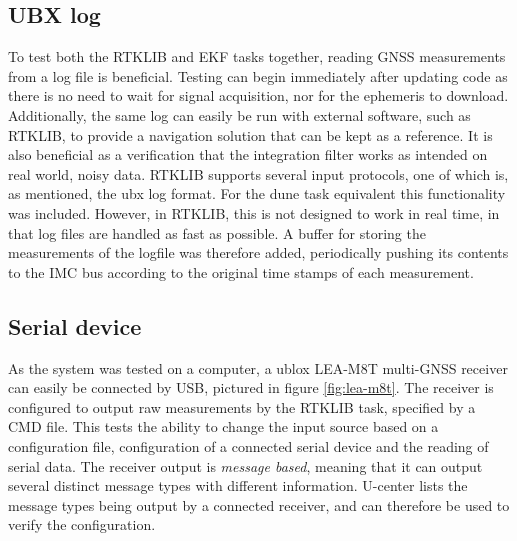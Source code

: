     \subsection{UBX log}
        \label{sec:rtklib-ubx-log}
        To test both the RTKLIB and EKF tasks together, reading GNSS measurements from a log file is beneficial. Testing can begin immediately after updating code as there is no need to wait for signal acquisition, nor for the ephemeris to download. Additionally, the same log can easily be run with external software, such as RTKLIB, to provide a navigation solution that can be kept as a reference. It is also beneficial as a verification that the integration filter works as intended on real world, noisy data. RTKLIB supports several input protocols, one of which is, as mentioned, the ubx log format. For the dune task equivalent this functionality was included. However, in RTKLIB, this is not designed to work in real time, in that log files are handled as fast as possible. A buffer for storing the measurements of the logfile was therefore added, periodically pushing its contents to the IMC bus according to the original time stamps of each measurement.
    
    \subsection{Serial device}
        As the system was tested on a computer, a ublox LEA-M8T multi-GNSS receiver can easily be connected by USB, pictured in figure \ref{fig:lea-m8t}. The receiver is configured to output raw measurements by the RTKLIB task, specified by a CMD file. This tests the ability to change the input source based on a configuration file, configuration of a connected serial device and the reading of serial data. The receiver output is \textit{message based}, meaning that it can output several distinct message types with different information. U-center lists the message types being output by a connected receiver, and can therefore be used to verify the configuration.
        
